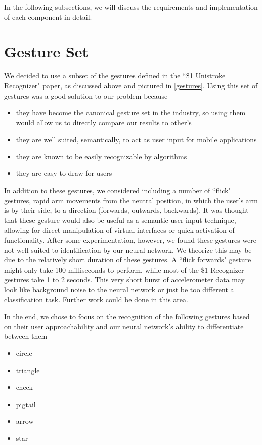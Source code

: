 \documentclass{report}
\begin{document}
In the following subsections, we will discuss the requirements and implementation of each component in detail.

\section{Gesture Set}


We decided to use a subset of the gestures defined in the ``\$1 Unistroke Recognizer" paper, as discussed above and pictured in \ref{gestures}. Using this set of gestures was a good solution to our problem because
\begin{itemize}
\item they have become the canonical gesture set in the industry, so using them would allow us to directly compare our results to other's
\item they are well suited, semantically, to act as user input for mobile applications
\item they are known to be easily recognizable by algorithms
\item they are easy to draw for users
\end{itemize}

In addition to these gestures, we considered including a number of ``flick" gestures, rapid arm movements from the neutral position, in which the user's arm is by their side, to a direction (forwards, outwards, backwards). It was thought that these gesture would also be useful as a semantic user input technique, allowing for direct manipulation of virtual interfaces or quick activation of functionality. After some experimentation, however, we found these gestures were not well suited to identification by our neural network. We theorize this may be due to the relatively short duration of these gestures. A ``flick forwards" gesture might only take 100 milliseconds to perform, while most of the \$1 Recognizer gestures take 1 to 2 seconds. This very short burst of accelerometer data may look like background noise to the neural network or just be too different a classification task. Further work could be done in this area.

In the end, we chose to focus on the recognition of the following gestures based on their user approachability and our neural network's ability to differentiate between them
\begin{itemize}
\item circle
\item triangle
\item check
\item pigtail
\item arrow
\item star
\end{itemize}
\end{document}
